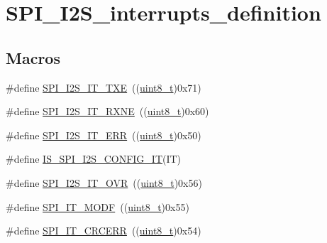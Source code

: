 \hypertarget{group___s_p_i___i2_s__interrupts__definition}{}\section{S\+P\+I\+\_\+\+I2\+S\+\_\+interrupts\+\_\+definition}
\label{group___s_p_i___i2_s__interrupts__definition}
\subsection*{Macros}
\begin{DoxyCompactItemize}
\item 
\#define \hyperlink{group___s_p_i___i2_s__interrupts__definition_ga0f192977fdb12c40d35672b8ae074724}{S\+P\+I\+\_\+\+I2\+S\+\_\+\+I\+T\+\_\+\+T\+XE}~((\hyperlink{_p_e___types_8h_aba7bc1797add20fe3efdf37ced1182c5}{uint8\+\_\+t})0x71)
\item 
\#define \hyperlink{group___s_p_i___i2_s__interrupts__definition_gae46dd53cd2e4ad8b8a7836d3dcec57ea}{S\+P\+I\+\_\+\+I2\+S\+\_\+\+I\+T\+\_\+\+R\+X\+NE}~((\hyperlink{_p_e___types_8h_aba7bc1797add20fe3efdf37ced1182c5}{uint8\+\_\+t})0x60)
\item 
\#define \hyperlink{group___s_p_i___i2_s__interrupts__definition_ga1d9d4916bf7ae315f23a54ecfbcd9157}{S\+P\+I\+\_\+\+I2\+S\+\_\+\+I\+T\+\_\+\+E\+RR}~((\hyperlink{_p_e___types_8h_aba7bc1797add20fe3efdf37ced1182c5}{uint8\+\_\+t})0x50)
\item 
\#define \hyperlink{group___s_p_i___i2_s__interrupts__definition_ga3ec2f6950d7ff801f992e65593c3365e}{I\+S\+\_\+\+S\+P\+I\+\_\+\+I2\+S\+\_\+\+C\+O\+N\+F\+I\+G\+\_\+\+IT}(IT)
\item 
\#define \hyperlink{group___s_p_i___i2_s__interrupts__definition_ga279c30176e8ff7e2ec299774a2e88f45}{S\+P\+I\+\_\+\+I2\+S\+\_\+\+I\+T\+\_\+\+O\+VR}~((\hyperlink{_p_e___types_8h_aba7bc1797add20fe3efdf37ced1182c5}{uint8\+\_\+t})0x56)
\item 
\#define \hyperlink{group___s_p_i___i2_s__interrupts__definition_ga0b9780d5f31fd80f4d0fa7d6860041e9}{S\+P\+I\+\_\+\+I\+T\+\_\+\+M\+O\+DF}~((\hyperlink{_p_e___types_8h_aba7bc1797add20fe3efdf37ced1182c5}{uint8\+\_\+t})0x55)
\item 
\#define \hyperlink{group___s_p_i___i2_s__interrupts__definition_ga9aa97a5ce8d3500dc14ca4e30eada199}{S\+P\+I\+\_\+\+I\+T\+\_\+\+C\+R\+C\+E\+RR}~((\hyperlink{_p_e___types_8h_aba7bc1797add20fe3efdf37ced1182c5}{uint8\+\_\+t})0x54)
\item 

\end{DoxyCompactItemize}
